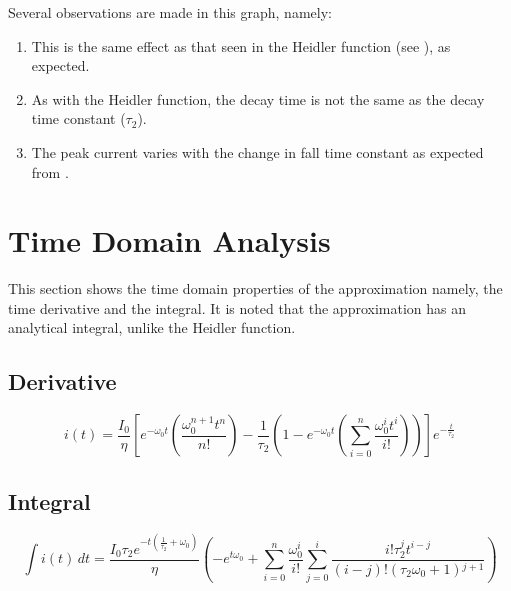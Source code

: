 Several observations are made in this graph, namely:
\begin{enumerate}
    \item This is the same effect as that seen in the Heidler function (see ), as expected.
    \item As with the Heidler function, the decay time is not the same as the decay time constant ($\tau_2$).
    \item The peak current varies with the change in fall time constant as expected from .
\end{enumerate}


\section{Time Domain Analysis}
\label{sec:approx_time_domain_analysis}
This section shows the time domain properties of the approximation namely, the time derivative and the integral. It is noted that the approximation has an analytical integral, unlike the Heidler function.

\subsection{Derivative}
\label{sub:approx_derivative}
\begin{equation}
    i(t) = \frac{I_0}{\eta} \left [ e^{-\omega_0 t} \left ( \frac{\omega_0^{n+1} t^n}{n!} \right ) - \frac{1}{\tau_2} \left ( 1 - e^{-\omega_0 t}\left ( \sum_{i=0}^n \frac{\omega_0^{i} t^i}{i!} \right ) \right ) \right ] e^{-\frac{t}{\tau_2}}
    \label{eqn:approx_deriv}
\end{equation}


\subsection{Integral}
\label{sub:approx_integral}
\begin{equation}
    \int i(t) \, dt = \frac{I_0 \tau _2 e^{-t \left(\frac{1}{\tau _2}+\omega _0\right)}}{\eta } \left(-e^{t \omega _0} + \sum _{i=0}^n \frac{\omega _0^i}{i!} \sum _{j=0}^i \frac{i! \tau _2^j t^{i-j}}{(i-j)! \left(\tau _2 \omega _0+1\right){}^{j+1}}\right)
    \label{eqn:approxInt}
\end{equation}

